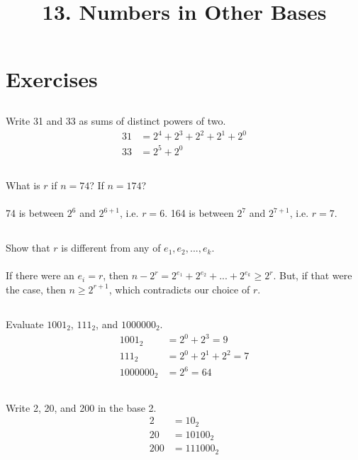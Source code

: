 \documentclass{article} \usepackage{amsmath}
\begin{document}
\newcommand{\Z}{\mathbb{Z}}
\newcommand{\s}{\sigma}
\newcommand{\p}{\phi}
\newcommand{\e}{\equiv}
\newcommand{\m}[1]{\ (\mathrm{mod}\ #1)}

\title{13. Numbers in Other Bases}
\section{Exercises}

\subsection{}
Write 31 and 33 as sums of distinct powers of two.
\begin{align*}
    31 &= 2^4 + 2^3 + 2^2 + 2^1 + 2^0\\
    33 &= 2^5 + 2^0
\end{align*}

\subsection{}
What is $r$ if $n = 74$? If $n = 174$?\\~\\
74 is between $2^6$ and $2^{6+1}$, i.e. $r = 6$.
164 is between $2^7$ and $2^{7+1}$, i.e. $r = 7$.

\subsection{}
Show that $r$ is different from any of $e_1, e_2, ..., e_k$.\\~\\
If there were an $e_i = r$, then
$n - 2^r = 2^{e_1} + 2^{e_2} + ... + 2^{e_k} \geq 2^r$.
But, if that were the case, then $n \geq 2^{r+1}$, which contradicts
our choice of $r$.

\subsection{}
Evaluate $1001_2$, $111_2$, and $1000000_2$.
\begin{align*}
    1001_2 &= 2^0 + 2^3 = 9\\
    111_2 &= 2^0 + 2^1 + 2^2 = 7\\
    1000000_2 &= 2^6 = 64
\end{align*}

\subsection{}
Write 2, 20, and 200 in the base 2.
\begin{align*}
    2 &= 10_2\\
    20 &= 10100_2\\
    200 &= 111000_2
\end{align*}
\end{document}
